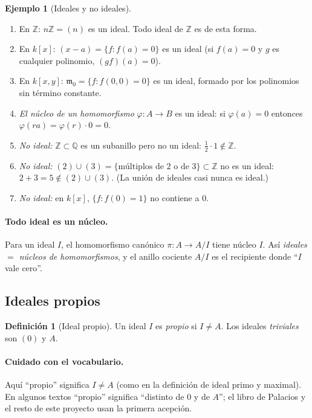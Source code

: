 \documentclass[11pt,a4paper]{article}
\newcommand{\ZZ}{\mathbb{Z}}
\newcommand{\QQ}{\mathbb{Q}}
\newcommand{\mm}{\mathfrak{m}}
\theoremstyle{plain}
\theoremstyle{definition}
\newtheorem{definicion}[teorema]{Definición}
\newtheorem{ejemplo}[teorema]{Ejemplo}
\theoremstyle{remark}
\newcounter{ej}
\begin{document}
\begin{ejemplo}[Ideales y no ideales]\label{ej:ideales}
\begin{enumerate}[label=(\alph*),itemsep=2pt]
\item En $\ZZ$: $n\ZZ=(n)$ es un ideal. Todo ideal de $\ZZ$ es de esta forma.
\item En $k[x]$: $(x-a)=\{f:f(a)=0\}$ es un ideal (si $f(a)=0$ y $g$ es cualquier polinomio, $(gf)(a)=0$).
\item En $k[x,y]$: $\mm_0=\{f:f(0,0)=0\}$ es un ideal, formado por los polinomios sin término constante.
\item \emph{El núcleo de un homomorfismo} $\varphi:A\to B$ es un ideal: si $\varphi(a)=0$ entonces $\varphi(ra)=\varphi(r)\cdot0=0$.
\item \emph{No ideal:} $\ZZ\subset\QQ$ es un subanillo pero no un ideal: $\tfrac12\cdot1\notin\ZZ$.
\item \emph{No ideal:} $(2)\cup(3)=\{\text{múltiplos de 2 o de 3}\}\subset\ZZ$ no es un ideal: $2+3=5\notin(2)\cup(3)$. (La unión de ideales casi nunca es ideal.)
\item \emph{No ideal:} en $k[x]$, $\{f:f(0)=1\}$ no contiene a $0$.
\end{enumerate}
\end{ejemplo}

\paragraph{Todo ideal es un núcleo.} Para un ideal $I$, el homomorfismo canónico $\pi:A\to A/I$ tiene núcleo $I$. Así \emph{ideales $=$ núcleos de homomorfismos}, y el anillo cociente $A/I$ es el recipiente donde ``$I$ vale cero''.

\subsection{Ideales propios}

\begin{definicion}[Ideal propio]
Un ideal $I$ es \emph{propio} si $I\ne A$. Los ideales \emph{triviales} son $(0)$ y $A$.
\end{definicion}

\paragraph{Cuidado con el vocabulario.} Aquí ``propio'' significa $I\ne A$ (como en la definición de ideal primo y maximal). En algunos textos ``propio'' significa ``distinto de $0$ y de $A$''; el libro de Palacios y el resto de este proyecto usan la primera acepción.
\end{document}
